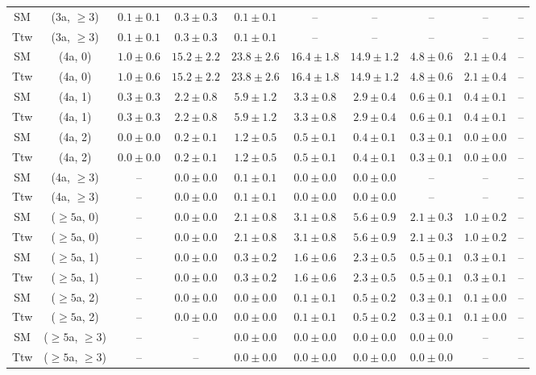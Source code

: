 \begin{table}[h!]
{\begin{tabular}{cccccccccc}
	SM & (3a, $\ge3$) & $0.1\pm 0.1$ & $0.3\pm 0.3$ & $0.1\pm 0.1$ & -- & -- & -- & -- & -- \\[0.5ex] 
	Ttw & (3a, $\ge3$) & $0.1\pm 0.1$ & $0.3\pm 0.3$ & $0.1\pm 0.1$ & -- & -- & -- & -- & -- \\[0.5ex] 
	SM & (4a, 0) & $1.0\pm 0.6$ & $15.2\pm 2.2$ & $23.8\pm 2.6$ & $16.4\pm 1.8$ & $14.9\pm 1.2$ & $4.8\pm 0.6$ & $2.1\pm 0.4$ & -- \\[0.5ex] 
	Ttw & (4a, 0) & $1.0\pm 0.6$ & $15.2\pm 2.2$ & $23.8\pm 2.6$ & $16.4\pm 1.8$ & $14.9\pm 1.2$ & $4.8\pm 0.6$ & $2.1\pm 0.4$ & -- \\[0.5ex] 
	SM & (4a, 1) & $0.3\pm 0.3$ & $2.2\pm 0.8$ & $5.9\pm 1.2$ & $3.3\pm 0.8$ & $2.9\pm 0.4$ & $0.6\pm 0.1$ & $0.4\pm 0.1$ & -- \\[0.5ex] 
	Ttw & (4a, 1) & $0.3\pm 0.3$ & $2.2\pm 0.8$ & $5.9\pm 1.2$ & $3.3\pm 0.8$ & $2.9\pm 0.4$ & $0.6\pm 0.1$ & $0.4\pm 0.1$ & -- \\[0.5ex] 
	SM & (4a, 2) & $0.0\pm 0.0$ & $0.2\pm 0.1$ & $1.2\pm 0.5$ & $0.5\pm 0.1$ & $0.4\pm 0.1$ & $0.3\pm 0.1$ & $0.0\pm 0.0$ & -- \\[0.5ex] 
	Ttw & (4a, 2) & $0.0\pm 0.0$ & $0.2\pm 0.1$ & $1.2\pm 0.5$ & $0.5\pm 0.1$ & $0.4\pm 0.1$ & $0.3\pm 0.1$ & $0.0\pm 0.0$ & -- \\[0.5ex] 
	SM & (4a, $\ge3$) & -- & $0.0\pm 0.0$ & $0.1\pm 0.1$ & $0.0\pm 0.0$ & $0.0\pm 0.0$ & -- & -- & -- \\[0.5ex] 
	Ttw & (4a, $\ge3$) & -- & $0.0\pm 0.0$ & $0.1\pm 0.1$ & $0.0\pm 0.0$ & $0.0\pm 0.0$ & -- & -- & -- \\[0.5ex] 
	SM & ($\ge5$a, 0) & -- & $0.0\pm 0.0$ & $2.1\pm 0.8$ & $3.1\pm 0.8$ & $5.6\pm 0.9$ & $2.1\pm 0.3$ & $1.0\pm 0.2$ & -- \\[0.5ex] 
	Ttw & ($\ge5$a, 0) & -- & $0.0\pm 0.0$ & $2.1\pm 0.8$ & $3.1\pm 0.8$ & $5.6\pm 0.9$ & $2.1\pm 0.3$ & $1.0\pm 0.2$ & -- \\[0.5ex] 
	SM & ($\ge5$a, 1) & -- & $0.0\pm 0.0$ & $0.3\pm 0.2$ & $1.6\pm 0.6$ & $2.3\pm 0.5$ & $0.5\pm 0.1$ & $0.3\pm 0.1$ & -- \\[0.5ex] 
	Ttw & ($\ge5$a, 1) & -- & $0.0\pm 0.0$ & $0.3\pm 0.2$ & $1.6\pm 0.6$ & $2.3\pm 0.5$ & $0.5\pm 0.1$ & $0.3\pm 0.1$ & -- \\[0.5ex] 
	SM & ($\ge5$a, 2) & -- & $0.0\pm 0.0$ & $0.0\pm 0.0$ & $0.1\pm 0.1$ & $0.5\pm 0.2$ & $0.3\pm 0.1$ & $0.1\pm 0.0$ & -- \\[0.5ex] 
	Ttw & ($\ge5$a, 2) & -- & $0.0\pm 0.0$ & $0.0\pm 0.0$ & $0.1\pm 0.1$ & $0.5\pm 0.2$ & $0.3\pm 0.1$ & $0.1\pm 0.0$ & -- \\[0.5ex] 
	SM & ($\ge5$a, $\ge3$) & -- & -- & $0.0\pm 0.0$ & $0.0\pm 0.0$ & $0.0\pm 0.0$ & $0.0\pm 0.0$ & -- & -- \\[0.5ex] 
	Ttw & ($\ge5$a, $\ge3$) & -- & -- & $0.0\pm 0.0$ & $0.0\pm 0.0$ & $0.0\pm 0.0$ & $0.0\pm 0.0$ & -- & -- \\[0.5ex] 
	\hline
	\hline
\end{tabular}}
\end{table}
